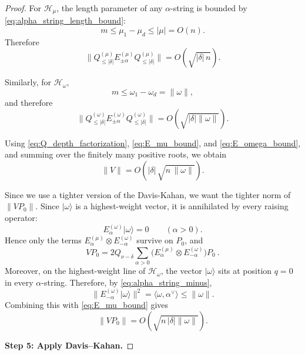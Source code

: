 \documentclass[a4paper,onecolumn,11pt]{quantumarticle}
\newcommand{\ket}[1]{| #1 \rangle}
\begin{document}
\begin{proof}
For \(\mathcal H_\mu\), the length parameter of any \(\alpha\)-string is bounded by \eqref{eq:alpha_string_length_bound}:
\[
m\le \mu_1-\mu_d\le |\mu|=O(n).
\]
Therefore
\begin{equation}\label{eq:E_mu_bound}
    \bigl\|Q_{\le |\delta|}^{(\mu)}E_{\pm\alpha}^{(\mu)}Q_{\le |\delta|}^{(\mu)}\bigr\|
    =
    O\!\left(\sqrt{|\delta|\,n}\right).
\end{equation}

Similarly, for \(\mathcal H_\omega\),
\[
m\le \omega_1-\omega_d=\|\omega\|,
\]
and therefore
\begin{equation}\label{eq:E_omega_bound}
    \bigl\|Q_{\le |\delta|}^{(\omega)}E_{\pm\alpha}^{(\omega)}Q_{\le |\delta|}^{(\omega)}\bigr\|
    =
    O\!\left(\sqrt{|\delta| \|\omega\|}\right).
\end{equation}

Using \eqref{eq:Q_depth_factorization}, \eqref{eq:E_mu_bound}, and \eqref{eq:E_omega_bound}, and summing over the finitely many positive roots, we obtain
\begin{equation}\label{eq:V_norm_bound}
    \|V\|
    =
    O\!\left(|\delta|\,\sqrt{n\,\|\omega\|}\right).
\end{equation}

Since we use a tighter version of the Davis-Kahan, we want the tighter norm of \(\|VP_0\|\). Since \(\ket{\omega}\) is a highest-weight vector, it is annihilated by every raising operator:
\[
E_\alpha^{(\omega)}\ket{\omega}=0
\qquad
(\alpha>0).
\]
Hence only the terms \(E_\alpha^{(\mu)}\otimes E_{-\alpha}^{(\omega)}\) survive on \(P_0\), and
\begin{equation}
    VP_0 = 2Q_{\nu-\delta}\sum_{\alpha>0}
    \bigl(E_\alpha^{(\mu)}\otimes E_{-\alpha}^{(\omega)}\bigr)P_0\ .
\end{equation}
Moreover, on the highest-weight line of \(\mathcal H_\omega\), the vector \(\ket{\omega}\) sits at position \(q=0\) in every \(\alpha\)-string. Therefore, by \eqref{eq:alpha_string_minus},
\[
\|E_{-\alpha}^{(\omega)}\ket{\omega}\|^2
= \langle \omega,\alpha^\vee\rangle
\le \|\omega\|.
\]
Combining this with \eqref{eq:E_mu_bound} gives
\begin{equation}\label{eq:VP0_bound}
    \|VP_0\| =  O\!\left(\sqrt{n\,|\delta| \|\omega\|}\right).
\end{equation}


\medskip
\noindent\textbf{Step 5: Apply Davis--Kahan.}


\end{proof}
\end{document}

